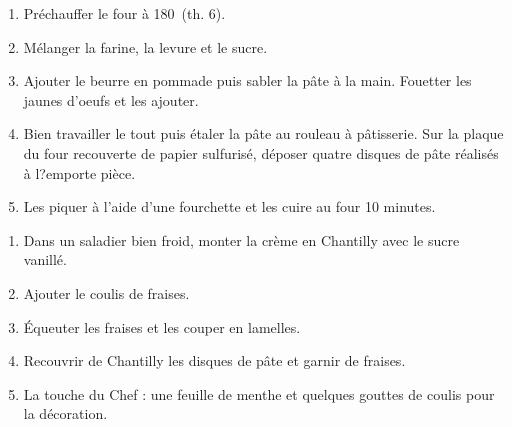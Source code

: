 \prep{}



\begin{ingredients}
\end{ingredients}


\begin{recipe}
  \begin{enumerate}

  \item   Pr\'echauffer le four \`a 180\degreeC\ (th. 6).

  \item M\'elanger la farine, la levure et le sucre.

  \item Ajouter le beurre en pommade puis sabler la p\^ate \`a la
    main.  Fouetter les jaunes d'oeufs et les ajouter.

  \item Bien travailler le tout puis \'etaler la p\^ate au rouleau \`a
    p\^atisserie.  Sur la plaque du four recouverte de papier
    sulfuris\'e, d\'eposer quatre disques de p\^ate r\'ealis\'es \`a
    l?emporte pi\`ece.

  \item Les piquer \`a l'aide d'une fourchette et les cuire au four 10
    minutes.

  \end{enumerate}
\end{recipe}



\begin{ingredients}
\end{ingredients}


\begin{recipe}
  \begin{enumerate}

  \item Dans un saladier bien froid, monter la cr\`eme en Chantilly
    avec le sucre vanill\'e.

  \item Ajouter le coulis de fraises.

  \item \'Equeuter les fraises et les couper en lamelles.

  \item Recouvrir de Chantilly les disques de p\^ate et garnir de
    fraises.

  \item La touche du Chef : une feuille de menthe et quelques gouttes
    de coulis pour la d\'ecoration.

  \end{enumerate}
\end{recipe}

